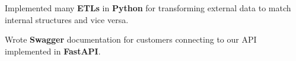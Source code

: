 \begin{rExperience}
  \item Implemented many \textbf{ETLs} in \textbf{Python} for transforming external data to match internal structures
    and vice versa.

  \item Wrote \textbf{Swagger} documentation for customers connecting to our API implemented in \textbf{FastAPI}.


\end{rExperience}

